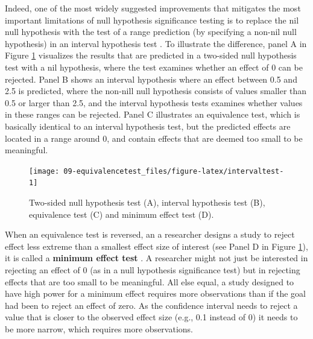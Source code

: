 \documentclass[
  oneside]{book}
\begin{document}
Indeed, one of the most widely suggested improvements that mitigates the most important limitations of null hypothesis significance testing is to replace the nil null hypothesis with the test of a range prediction (by specifying a non-nil null hypothesis) in an interval hypothesis test \citep{lakens_practical_2021}. To illustrate the difference, panel A in Figure \ref{fig:intervaltest} visualizes the results that are predicted in a two-sided null hypothesis test with a nil hypothesis, where the test examines whether an effect of 0 can be rejected. Panel B shows an interval hypothesis where an effect between 0.5 and 2.5 is predicted, where the non-nill null hypothesis consists of values smaller than 0.5 or larger than 2.5, and the interval hypothesis tests examines whether values in these ranges can be rejected. Panel C illustrates an equivalence test, which is basically identical to an interval hypothesis test, but the predicted effects are located in a range around 0, and contain effects that are deemed too small to be meaningful.

\begin{figure}

{\centering \texttt{[image: 09-equivalencetest\_files/figure-latex/intervaltest-1]} 

}

\caption{Two-sided null hypothesis test (A), interval hypothesis test (B), equivalence test (C) and minimum effect test (D).}\label{fig:intervaltest}
\end{figure}

When an equivalence test is reversed, an a researcher designs a study to reject effect less extreme than a smallest effect size of interest (see Panel D in Figure \ref{fig:intervaltest}), it is called a \textbf{minimum effect test} \citep{murphy_testing_1999}. A researcher might not just be interested in rejecting an effect of 0 (as in a null hypothesis significance test) but in rejecting effects that are too small to be meaningful. All else equal, a study designed to have high power for a minimum effect requires more observations than if the goal had been to reject an effect of zero. As the confidence interval needs to reject a value that is closer to the observed effect size (e.g., 0.1 instead of 0) it needs to be more narrow, which requires more observations.
\end{document}

